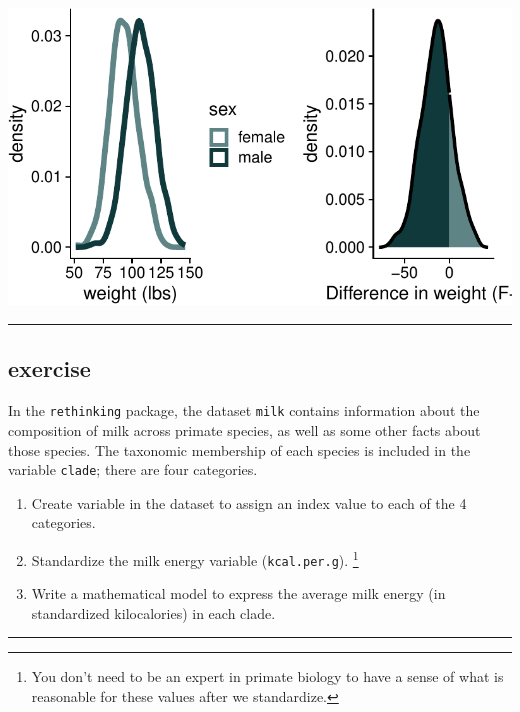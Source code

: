 \documentclass[
  letterpaper,
  DIV=11,
  numbers=noendperiod]{scrartcl}
\providecommand{\tightlist}{%
  \setlength{\itemsep}{0pt}\setlength{\parskip}{0pt}}\usepackage{longtable,booktabs,array}
\begin{document}
\begin{center}
\includegraphics[width=17.1875in,height=\textheight]{lecture02-2_files/figure-pdf/unnamed-chunk-9-1.pdf}
\end{center}

\begin{center}\rule{0.5\linewidth}{0.5pt}\end{center}

\subsection{exercise}\label{exercise}

In the \texttt{rethinking} package, the dataset \texttt{milk} contains
information about the composition of milk across primate species, as
well as some other facts about those species. The taxonomic membership
of each species is included in the variable \texttt{clade}; there are
four categories.

\begin{enumerate}
\def\labelenumi{\arabic{enumi}.}
\tightlist
\item
  Create variable in the dataset to assign an index value to each of the
  4 categories.
\item
  Standardize the milk energy variable (\texttt{kcal.per.g}).
  \footnote{You don't need to be an expert in primate biology to have a
    sense of what is reasonable for these values after we standardize.}
\item
  Write a mathematical model to express the average milk energy (in
  standardized kilocalories) in each clade.
\end{enumerate}

\begin{center}\rule{0.5\linewidth}{0.5pt}\end{center}
\end{document}
